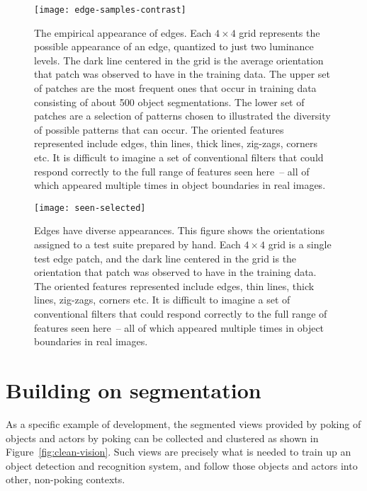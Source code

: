 


\begin{figure}[bt]
\centerline{
\texttt{[image: edge-samples-contrast]}
}
\caption[The appearance of edges]{
%
The empirical appearance of edges.  Each $4\times 4$ grid represents
the possible appearance of an edge, quantized to just two luminance
levels.  The dark line centered in the grid is the average orientation
that patch was observed to have in the training data.
The upper set of patches are the most frequent ones that occur in
training data consisting of about 500 object segmentations.
The lower set of patches are a selection of patterns chosen to
illustrated the diversity of possible patterns that can occur.
The oriented features represented
include edges, thin lines, thick lines, zig-zags, corners
etc.  It is difficult to imagine a set of conventional
filters that could respond correctly to the full range of 
features seen here~-- all of which appeared multiple
times in object boundaries in real images.
%
}
\label{fig:seen-selected}
\end{figure}


\ifnote
\begin{figure}[bt]
\texttt{[image: seen-selected]}
\caption
{
%
Edges have diverse appearances.  This figure shows 
the orientations assigned to a test suite
prepared by hand.  Each $4\times 4$ grid is a single test
edge patch, and the dark line centered in the grid is the orientation
that patch was observed to have in the training data.
The oriented features represented
include edges, thin lines, thick lines, zig-zags, corners
etc.  It is difficult to imagine a set of conventional
filters that could respond correctly to the full range of 
features seen here~-- all of which appeared multiple
times in object boundaries in real images.
%
}
\label{fig:seen-selected}
\end{figure}
\fi

\section{Building on segmentation}


As a specific example of development, the segmented views provided by
poking of objects and actors by poking can be collected and clustered
as shown in Figure~\ref{fig:clean-vision}.  Such views are precisely
what is needed to train up an object detection and recognition system,
and follow those objects and actors into other, non-poking contexts.

